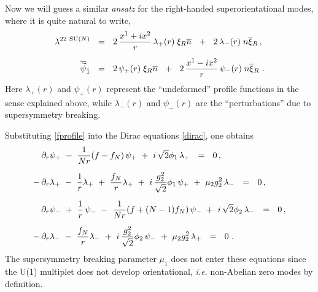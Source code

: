 \documentclass[12pt]{article}
\newcommand{\p}{\partial}
\newcommand{\wt}{\widetilde}
\newcommand{\ov}{\overline}
\begin{document}
	Now we will guess a similar {\it ansatz} for the right-handed superorientational modes, where it
	is quite natural to write,
\begin{align}
%
\notag
	\lambda^{22\ \text{SU($N$)}} & ~~=~~ 2\, \frac{x^1 + ix^2}{r}\, \lambda_+(r) \; \xi_R\ov{n}
				~~+~~  2\, \lambda_-(r)\; n\ov{\xi}{}_R\,,
	\\[2mm]
%
\label{fprofile}
	\ov{\wt{\psi}}{}_{\dot{1}} & ~~=~~ 2\, \psi_+(r)\; \xi_R \ov{n} 
				~~+~~  2\, \frac{x^1 - i x^2}{r}\, \psi_-(r)\; n\ov{\xi}{}_R~.
\end{align}
	Here $ \lambda_+(r) $ and $ \psi_+(r) $ represent the ``undeformed'' profile functions in the sense
	explained above, while $ \lambda_-(r) $ and $ \psi_-(r) $ are the ``perturbations'' due to supersymmetry
	breaking.

	Substituting \eqref{fprofile} into the Dirac equations \eqref{dirac}, one obtains
\begin{align}
%
\notag
&
	\p_r \psi_+ ~-~ \frac{1}{Nr} (f-f_N)\, \psi_+ ~+~ i\,\sqrt{2}\phi_1\,\lambda_+ ~~=~~ 0\,,
	\\[2mm]
%
\notag
	-\, & \p_r\lambda_+ ~-~ \frac{1}{r}\lambda_+ ~+~ \frac{f_N}{r}\lambda_+ 
		~+~ i\,\frac{g_2^2}{\sqrt{2}}\phi_1\, \psi_+ ~+~ \mu_2 g_2^2\, \lambda_-  ~~=~~ 0\,,
	\\[2mm]
%
\label{fermeqs}
&
	\p_r \psi_- ~+~ \frac{1}{r}\, \psi_- ~-~ \frac{1}{Nr}(f + (N-1)f_N)\, \psi_- 
							~+~ i\,\sqrt{2}\phi_2\, \lambda_- ~~=~~ 0\,,
	\\[2mm]
%
\notag
	-\, & \p_r\lambda_- ~-~ \frac{f_N}{r}\lambda_- ~+~ i\,\frac{g_2^2}{\sqrt{2}}\phi_2\, \psi_- 
								~+~ \mu_2 g_2^2\, \lambda_+ ~~=~~ 0
	~.
\end{align}
	The supersymmetry breaking parameter $ \mu_1 $ does not enter these equations since the  U(1) 
	multiplet does not develop orientational, {\it i.e.} non-Abelian zero modes by definition.

\end{document}
